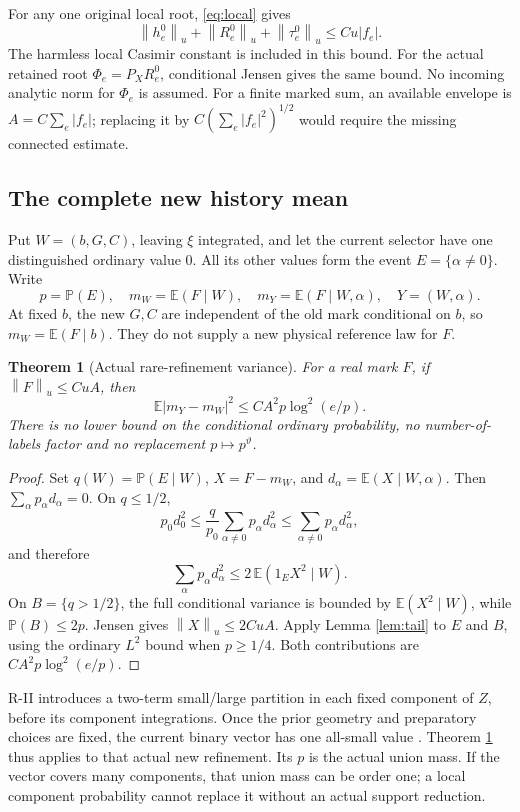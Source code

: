 \documentclass[11pt,letterpaper]{article}
\newtheorem{theorem}{Theorem}[section]
\theoremstyle{remark}\newtheorem{remark}[theorem]{Remark}
\newcommand{\E}{\mathbb E}
\newcommand{\norm}[1]{\left\lVert#1\right\rVert}
\begin{document}
For any one original local root, \eqref{eq:local} gives
\[
 \norm{h_e^0}_u+\norm{R_e^0}_u+\norm{\tau_e^0}_u
 \le C u |f_e|.
\]
The harmless local Casimir constant is included in this bound. For the actual retained root \(\Phi_e=P_XR_e^0\), conditional Jensen gives the same bound. No incoming analytic norm for \(\Phi_e\) is assumed. For a finite marked sum, an available envelope is \(A=C\sum_e|f_e|\); replacing it by \(C(\sum_e|f_e|^2)^{1/2}\) would require the missing connected estimate.

\subsection{The complete new history mean}

Put \(W=(b,G,C)\), leaving \(\xi\) integrated, and let the current selector have one distinguished ordinary value \(0\). All its other values form the event \(E=\{\alpha\ne0\}\). Write
\[
 p=\mathbb P(E),\quad m_W=\E(F\mid W),\quad
 m_Y=\E(F\mid W,\alpha),\quad Y=(W,\alpha).
\]
At fixed \(b\), the new \(G,C\) are independent of the old mark conditional on \(b\), so \(m_W=\E(F\mid b)\). They do not supply a new physical reference law for \(F\).

\begin{theorem}[Actual rare-refinement variance]\label{thm:rare}
For a real mark \(F\), if \(\norm{F}_u\le CuA\), then
\begin{equation}\label{eq:rare}
 \boxed{\quad
 \E|m_Y-m_W|^2\le C A^2p\log^2(e/p).
 \quad}
\end{equation}
There is no lower bound on the conditional ordinary probability, no number-of-labels factor and no replacement \(p\mapsto p^\vartheta\).
\end{theorem}
\begin{proof}
Set \(q(W)=\mathbb P(E\mid W)\), \(X=F-m_W\), and
\(d_\alpha=\E(X\mid W,\alpha)\). Then
\(\sum_\alpha p_\alpha d_\alpha=0\). On \(q\le1/2\),
\[
 p_0d_0^2
 \le\frac{q}{p_0}\sum_{\alpha\ne0}p_\alpha d_\alpha^2
 \le\sum_{\alpha\ne0}p_\alpha d_\alpha^2,
\]
and therefore
\[
 \sum_\alpha p_\alpha d_\alpha^2
 \le2\,\E(1_E X^2\mid W).
\]
On \(B=\{q>1/2\}\), the full conditional variance is bounded by
\(\E(X^2\mid W)\), while \(\mathbb P(B)\le2p\). Jensen gives
\(\norm{X}_u\le2CuA\). Apply Lemma \ref{lem:tail} to \(E\) and \(B\), using the ordinary \(L^2\) bound when \(p\ge1/4\). Both contributions are \(CA^2p\log^2(e/p)\).
\end{proof}

R-II introduces a two-term small/large partition in each fixed component of \(Z\), before its component integrations. Once the prior geometry and preparatory choices are fixed, the current binary vector has one all-small value \cite{RII}. Theorem \ref{thm:rare} thus applies to that actual new refinement. Its \(p\) is the actual union mass. If the vector covers many components, that union mass can be order one; a local component probability cannot replace it without an actual support reduction.
\end{document}
